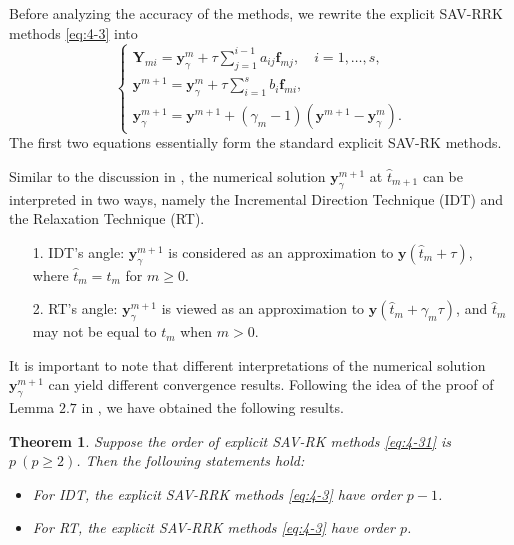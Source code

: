 \documentclass[preprint,compress,3p,10pt,fleqn]{elsarticle}
\numberwithin{equation}{section}
\newtheorem{theorem}{Theorem}[section]
\begin{document}
Before analyzing the accuracy of the methods, we rewrite the explicit SAV-RRK methods \eqref{eq:4-3} into
\begin{equation}
\left\{\begin{array}{l}
\bm{Y}_{m i}=\bm{y}_\gamma^m+\tau \sum\limits_{j=1}^{i-1} a_{i j} \bm{f}_{m j}, \quad i=1, \ldots, s, \\
\bm{y}^{m+1}=\bm{y}_\gamma^m+\tau \sum\limits_{i=1}^s b_i \bm{f}_{m i},\\
\bm{y}_\gamma^{m+1}=\bm{y}^{m+1}+\left(\gamma_m-1\right)\left(\bm{y}^{m+1}-\bm{y}_\gamma^m\right) .
\end{array}\right.\label{eq:4-321}
\end{equation}
The first two equations essentially form the standard explicit SAV-RK methods.

Similar to the discussion in \cite{ketchesonRelaxationRungeKutta2019}, the numerical solution $\bm{y}_\gamma^{m+1}$ at $\hat{t}_{m+1}$ can be interpreted in two ways, namely the Incremental Direction Technique (IDT) and the Relaxation Technique (RT).
\begin{itemize}
\item[1.] IDT's angle: $\bm{y}_\gamma^{m+1}$ is considered as an approximation to $\bm{y}\left(\hat{t}_m+\tau\right)$, where $\hat{t}_m=t_m$ for $m \geq 0$.
\item[2.] RT's angle: $\bm{y}_\gamma^{m+1}$ is viewed as an approximation to $\bm{y}\left(\hat{t}_m+\gamma_m \tau\right)$, and $\hat{t}_m$ may not be equal to $t_m$ when $m>0$.
\end{itemize}

It is important to note that different interpretations of the numerical solution $\bm{y}_\gamma^{m+1}$ can yield different convergence results. Following the idea of the proof of Lemma $2.7$ in \cite{ranochaGeneralRelaxationMethods2020}, we have obtained the following results.

\begin{theorem}\label{thm:5_4}
Suppose the order of explicit SAV-RK methods \eqref{eq:4-31} is $p~(p \geq 2)$. Then the following statements hold:
\begin{itemize}
\item For IDT, the explicit SAV-RRK methods \eqref{eq:4-3} have order $p-1$.
\item For RT, the explicit SAV-RRK methods \eqref{eq:4-3} have order $p$.
\end{itemize}
\end{theorem}
\end{document}
